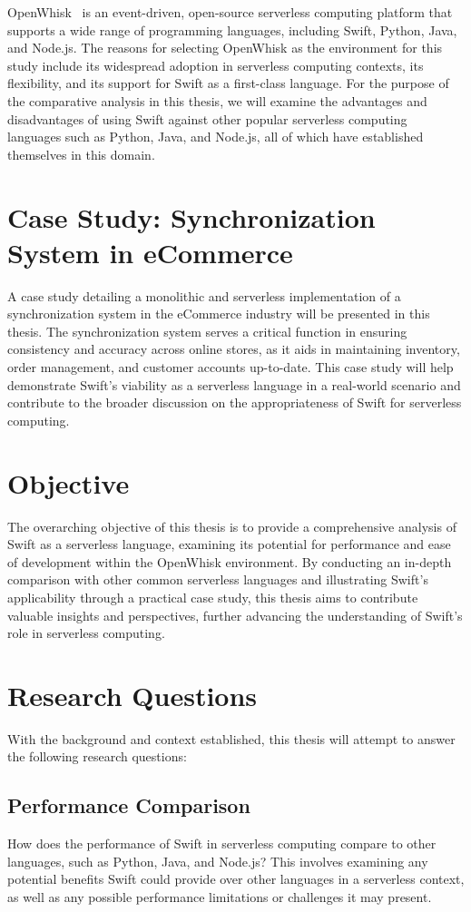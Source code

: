 OpenWhisk~\cite{openwhisk2023} is an event-driven, open-source serverless computing platform that supports a wide range of programming languages, including Swift, Python, Java, and Node.js. The reasons for selecting OpenWhisk as the environment for this study include its widespread adoption in serverless computing contexts, its flexibility, and its support for Swift as a first-class language. For the purpose of the comparative analysis in this thesis, we will examine the advantages and disadvantages of using Swift against other popular serverless computing languages such as Python, Java, and Node.js, all of which have established themselves in this domain.

\section{Case Study: Synchronization System in eCommerce}

A case study detailing a monolithic and serverless implementation of a synchronization system in the eCommerce industry will be presented in this thesis. The synchronization system serves a critical function in ensuring consistency and accuracy across online stores, as it aids in maintaining inventory, order management, and customer accounts up-to-date. This case study will help demonstrate Swift's viability as a serverless language in a real-world scenario and contribute to the broader discussion on the appropriateness of Swift for serverless computing.
\section{Objective}

The overarching objective of this thesis is to provide a comprehensive analysis of Swift as a serverless language, examining its potential for performance and ease of development within the OpenWhisk environment. By conducting an in-depth comparison with other common serverless languages and illustrating Swift's applicability through a practical case study, this thesis aims to contribute valuable insights and perspectives, further advancing the understanding of Swift's role in serverless computing.
\section{Research Questions}
With the background and context established, this thesis will attempt to answer the following research questions:

\subsection{Performance Comparison}
How does the performance of Swift in serverless computing compare to other languages, such as Python, Java, and Node.js? This involves examining any potential benefits Swift could provide over other languages in a serverless context, as well as any possible performance limitations or challenges it may present.

